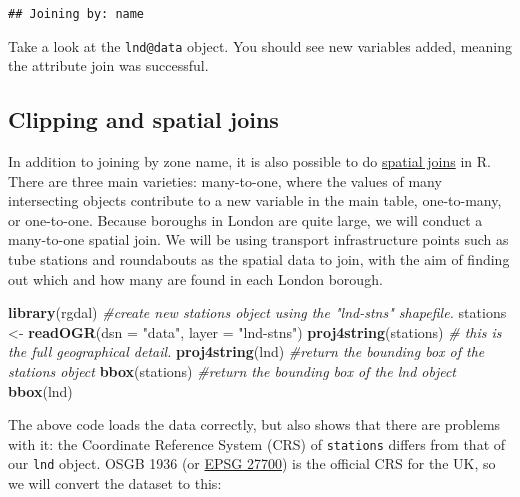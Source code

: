 \documentclass[]{article}
\newenvironment{Shaded}{}{}
\newcommand{\KeywordTok}[1]{\textcolor[rgb]{0.00,0.44,0.13}{\textbf{{#1}}}}
\newcommand{\DataTypeTok}[1]{\textcolor[rgb]{0.56,0.13,0.00}{{#1}}}
\newcommand{\StringTok}[1]{\textcolor[rgb]{0.25,0.44,0.63}{{#1}}}
\newcommand{\CommentTok}[1]{\textcolor[rgb]{0.38,0.63,0.69}{\textit{{#1}}}}
\newcommand{\NormalTok}[1]{{#1}}
\begin{document}
\begin{verbatim}
## Joining by: name
\end{verbatim}

Take a look at the \texttt{lnd@data} object. You should see new
variables added, meaning the attribute join was successful.

\subsection{Clipping and spatial
joins}\label{clipping-and-spatial-joins}

In addition to joining by zone name, it is also possible to do
\href{http://help.arcgis.com/en/arcgisdesktop/10.0/help/index.html\#//00080000000q000000}{spatial
joins} in R. There are three main varieties: many-to-one, where the
values of many intersecting objects contribute to a new variable in the
main table, one-to-many, or one-to-one. Because boroughs in London are
quite large, we will conduct a many-to-one spatial join. We will be
using transport infrastructure points such as tube stations and
roundabouts as the spatial data to join, with the aim of finding out
which and how many are found in each London borough.

\begin{Shaded}
\begin{Highlighting}[]
\KeywordTok{library}\NormalTok{(rgdal)}
\CommentTok{#create new stations object using the "lnd-stns" shapefile.}
\NormalTok{stations <-}\StringTok{ }\KeywordTok{readOGR}\NormalTok{(}\DataTypeTok{dsn =} \StringTok{"data"}\NormalTok{, }\DataTypeTok{layer =} \StringTok{"lnd-stns"}\NormalTok{)}
\KeywordTok{proj4string}\NormalTok{(stations) }\CommentTok{# this is the full geographical detail.}
\KeywordTok{proj4string}\NormalTok{(lnd)}
\CommentTok{#return the bounding box of the stations object}
\KeywordTok{bbox}\NormalTok{(stations)}
\CommentTok{#return the bounding box of the lnd object}
\KeywordTok{bbox}\NormalTok{(lnd)}
\end{Highlighting}
\end{Shaded}

The above code loads the data correctly, but also shows that there are
problems with it: the Coordinate Reference System (CRS) of
\texttt{stations} differs from that of our \texttt{lnd} object. OSGB
1936 (or \href{http://spatialreference.org/ref/epsg/27700/}{EPSG 27700})
is the official CRS for the UK, so we will convert the dataset to this:
\end{document}
